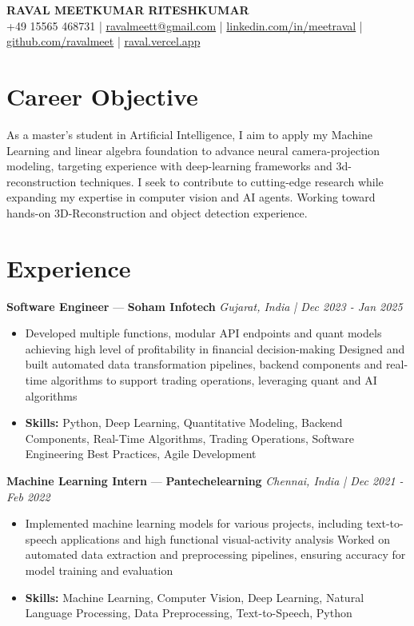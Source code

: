 \documentclass[a4paper,10pt]{article}
\begin{document}
\begin{center}
  {\Large\bfseries RAVAL MEETKUMAR RITESHKUMAR}\\[2pt]
  {\small +49 15565 468731 \;|\; \href{mailto:ravalmeett@gmail.com}{ravalmeett@gmail.com} \;|\; \href{https://www.linkedin.com/in/meetraval/}{linkedin.com/in/meetraval} \;|\; \href{https://github.com/ravalmeet}{github.com/ravalmeet} \;|\; \href{https://raval.vercel.app/}{raval.vercel.app}}
\end{center}
\vspace{-3pt}

\section*{Career Objective}
As a master's student in Artificial Intelligence, I aim to apply my Machine Learning and linear algebra foundation to advance neural camera-projection modeling, targeting experience with deep-learning frameworks and 3d-reconstruction techniques. I seek to contribute to cutting-edge research while expanding my expertise in computer vision and AI agents. Working toward hands-on 3D-Reconstruction and object detection experience.\par

\section*{Experience}
\textbf{Software Engineer} — \textbf{Soham Infotech} \hfill \textit{Gujarat, India \;|\; Dec 2023 - Jan 2025}\par
\vspace{1pt}
\begin{itemize}
  \item Developed multiple functions, modular API endpoints and quant models achieving high level of profitability in financial decision-making Designed and built automated data transformation pipelines, backend components and real-time algorithms to support trading operations, leveraging quant and AI algorithms
  \item \textbf{Skills:} Python, Deep Learning, Quantitative Modeling, Backend Components, Real-Time Algorithms, Trading Operations, Software Engineering Best Practices, Agile Development
\end{itemize}
\vspace{3pt}
\textbf{Machine Learning Intern} — \textbf{Pantechelearning} \hfill \textit{Chennai, India \;|\; Dec 2021 - Feb 2022}\par
\vspace{1pt}
\begin{itemize}
  \item Implemented machine learning models for various projects, including text-to-speech applications and high functional visual-activity analysis Worked on automated data extraction and preprocessing pipelines, ensuring accuracy for model training and evaluation
  \item \textbf{Skills:} Machine Learning, Computer Vision, Deep Learning, Natural Language Processing, Data Preprocessing, Text-to-Speech, Python
\end{itemize}
\end{document}
